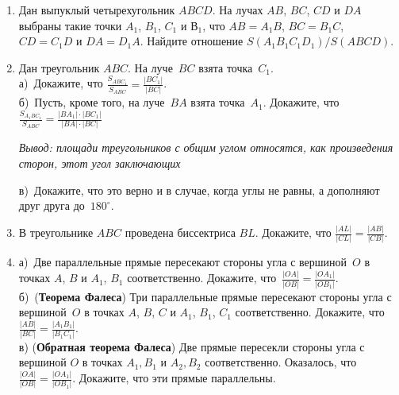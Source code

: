\begin{enumerate}
\item Дан выпуклый четырехугольник $ABCD$. На лучах $AB$, $BC$, $CD$ и $DA$ выбраны такие точки $A_1$, $B_1$, $C_1$ и $В_1$, что $AB=A_1B$, $BC=B_1C$, $CD=C_1D$ и $DA=D_1A$. Найдите отношение $S(A_1B_1C_1D_1)/S(ABCD)$.


\item Дан треугольник $ABC$. На луче~$BC$ взята точка~$C_1$.\\
а)~Докажите, что $\frac{S_{ABC_1}}{S_{ABC}} = \frac{|BC_1|}{|BC|}$.\\
б)~Пусть, кроме того, на луче~$BA$ взята точка~$A_1$. Докажите, что
$\frac{S_{A_1BC_1}}{S_{ABC}} = \frac{|BA_1|\cdot |BC_1| }{|BA| \cdot |BC|}$

{\it Вывод: площади треугольников с общим углом относятся, как произведения сторон, этот угол заключающих}

в)~Докажите, что это верно и в случае, когда углы не равны, а дополняют
друг друга до~$180^\circ$.



\item В треугольнике $ABC$ проведена биссектриса $BL$. Докажите, что $\frac{|AL|}{|CL|}=\frac{|AB|}{|CB|}$.

\item а)~Две параллельные прямые пересекают стороны угла с вершиной~$O$ в точках
$A$, $B$ и $A_1$, $B_1$ соответственно. Докажите, что~$\frac{|OA|}{|OB|} = \frac {|OA_1|}{|OB_1|}$.\\
б)~({\bf Теорема Фалеса}) Три параллельные прямые пересекают стороны угла с вершиной~$O$ в точках
$A$, $B$, $C$ и $A_1$, $B_1$, $C_1$ соответственно. Докажите, что~$\frac{|AB|}{|BC|} = \frac {|A_1B_1|}{|B_1C_1|}$.\\
в) ({\bf Обратная теорема Фалеса}) Две прямые пересекли стороны угла с вершиной $O$ в точках $A_{1},B_{1}$ и $A_{2}, B_{2}$ соответственно. Оказалось, что $\frac{|OA|}{|OB|} = \frac {|OA_1|}{|OB_1|}$. Докажите, что эти прямые параллельны.


\end{enumerate}